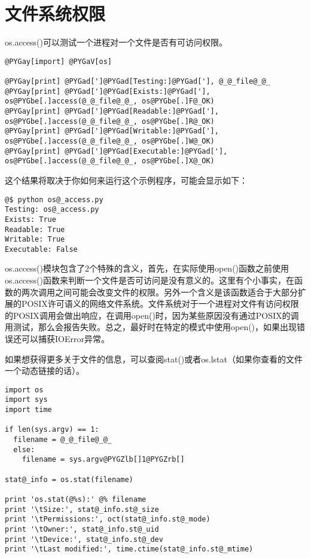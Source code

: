\documentclass[a4paper,10pt,english]{manual}
\begin{document}
\section{文件系统权限}

os.access()可以测试一个进程对一个文件是否有可访问权限。

\begin{Verbatim}[commandchars=@\[\]]
@PYGay[import] @PYGaV[os]

@PYGay[print] @PYGad[']@PYGad[Testing:]@PYGad['], @_@_file@_@_
@PYGay[print] @PYGad[']@PYGad[Exists:]@PYGad['], os@PYGbe[.]access(@_@_file@_@_, os@PYGbe[.]F@_OK)
@PYGay[print] @PYGad[']@PYGad[Readable:]@PYGad['], os@PYGbe[.]access(@_@_file@_@_, os@PYGbe[.]R@_OK)
@PYGay[print] @PYGad[']@PYGad[Writable:]@PYGad['], os@PYGbe[.]access(@_@_file@_@_, os@PYGbe[.]W@_OK)
@PYGay[print] @PYGad[']@PYGad[Executable:]@PYGad['], os@PYGbe[.]access(@_@_file@_@_, os@PYGbe[.]X@_OK)
\end{Verbatim}

这个结果将取决于你如何来运行这个示例程序，可能会显示如下：

\begin{Verbatim}[commandchars=@\[\]]
@$ python os@_access.py
Testing: os@_access.py
Exists: True
Readable: True
Writable: True
Executable: False
\end{Verbatim}

os.access()模块包含了2个特殊的含义，首先，在实际使用open()函数之前使用os.access()函数来判断一个文件是否可访问是没有意义的。这里有个小事实，在函数的两次调用之间可能会改变文件的权限。另外一个含义是该函数适合于大部分扩展的POSIX许可语义的网络文件系统。文件系统对于一个进程对文件有访问权限的POSIX调用会做出响应，在调用open()时，因为某些原因没有通过POSIX的调用测试，那么会报告失败。总之，最好时在特定的模式中使用open()，如果出现错误还可以捕获IOError异常。

如果想获得更多关于文件的信息，可以查阅stat()或者os.lstat（如果你查看的文件一个动态链接的话）。

\begin{Verbatim}[commandchars=@\[\]]
import os
import sys
import time

if len(sys.argv) == 1:
  filename = @_@_file@_@_
  else:
    filename = sys.argv@PYGZlb[]1@PYGZrb[]

stat@_info = os.stat(filename)

print 'os.stat(@%s):' @% filename
print '\tSize:', stat@_info.st@_size
print '\tPermissions:', oct(stat@_info.st@_mode)
print '\tOwner:', stat@_info.st@_uid
print '\tDevice:', stat@_info.st@_dev
print '\tLast modified:', time.ctime(stat@_info.st@_mtime)
\end{Verbatim}
\end{document}
